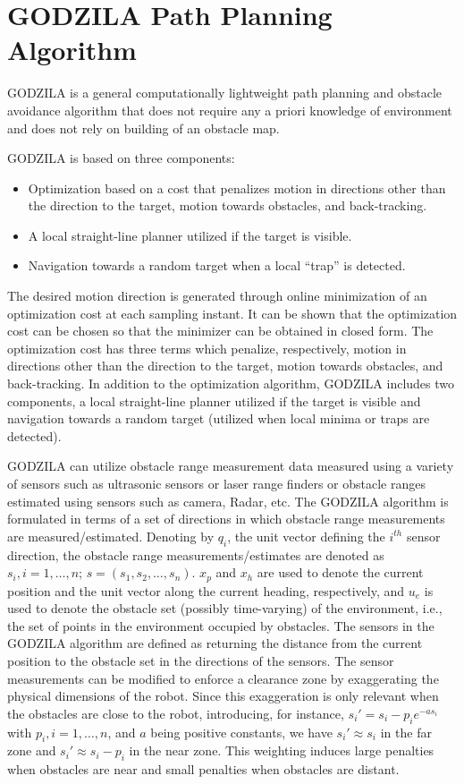 \chapter{GODZILA Path Planning Algorithm}

GODZILA \cite{KK05b_jirs} is a general computationally lightweight path planning and obstacle avoidance algorithm that does not require any a priori knowledge of environment and does not rely on building of an obstacle map.

GODZILA is based on three components:		

\begin{itemize}
\item
Optimization based on a cost that penalizes motion in directions other than the direction to the target, motion towards obstacles, and back-tracking.
\item
A local straight-line planner utilized if the target is visible.
\item
Navigation towards a random target when a local ``trap'' is detected.
\end{itemize}

The desired motion direction is generated through online minimization of an optimization cost at each sampling instant.  It can be shown that the optimization cost can be chosen so that the minimizer can be obtained in closed form.  The optimization cost has three terms which penalize, respectively, motion in directions other than the direction to the target, motion towards obstacles, and back-tracking.  In addition to the optimization algorithm, GODZILA includes two components, a local straight-line planner utilized if the target is visible and navigation towards a random target (utilized when local minima or traps are detected). 

GODZILA can utilize obstacle range measurement data  measured using a variety of sensors such as ultrasonic sensors or laser range finders or obstacle ranges estimated using sensors such as camera, Radar, etc. The GODZILA algorithm is formulated in terms of a set of directions in which obstacle range measurements are measured/estimated. Denoting by $q_i$, the unit vector defining the $i^{th}$ sensor direction, the obstacle range measurements/estimates are denoted as $s_i,i=1,\ldots,n$; $s=(s_1,s_2,\ldots,s_n)$.
$x_p$ and $x_h$ are used to denote the current position and the unit vector along the current heading, respectively, and
$u_e$ is used to denote the obstacle set (possibly time-varying) of the environment, i.e., the set of points in the environment occupied by obstacles. The sensors in the GODZILA algorithm are defined as returning the distance from the current position to the obstacle set in the directions of the sensors. The sensor measurements can be modified to enforce a clearance zone by exaggerating the physical dimensions of the robot.  Since this exaggeration is only relevant when the obstacles are close to the robot, introducing, for instance, $s_i'=s_i-p_i e^{-a s_i}$ with $p_i,i=1,\ldots,n$, and $a$ being positive constants, we have $s_i'\approx s_i$ in the far zone and $s_i'\approx s_i-p_i$ in the near zone. This weighting induces large penalties when obstacles are near and small penalties when obstacles are distant.  


